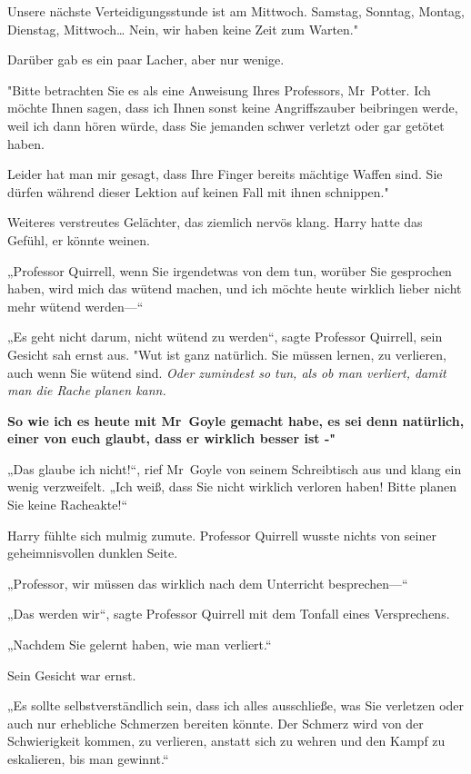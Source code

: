 {Unsere nächste Verteidigungsstunde ist am Mittwoch. Samstag, Sonntag, Montag, Dienstag, Mittwoch… Nein, wir haben keine Zeit zum Warten."

Darüber gab es ein paar Lacher, aber nur wenige.

"Bitte betrachten Sie es als eine Anweisung Ihres Professors, Mr~Potter. Ich möchte Ihnen sagen, dass ich Ihnen sonst keine Angriffszauber beibringen werde, weil ich dann hören würde, dass Sie jemanden schwer verletzt oder gar getötet haben.

Leider hat man mir gesagt, dass Ihre Finger bereits mächtige Waffen sind. Sie dürfen während dieser Lektion auf keinen Fall mit ihnen schnippen."

Weiteres verstreutes Gelächter, das ziemlich nervös klang. Harry hatte das Gefühl, er könnte weinen.

„Professor Quirrell, wenn Sie irgendetwas von dem tun, worüber Sie gesprochen haben, wird mich das wütend machen, und ich möchte heute wirklich lieber nicht mehr wütend werden—“

„Es geht nicht darum, nicht wütend zu werden“, sagte Professor Quirrell, sein Gesicht sah ernst aus. "Wut ist ganz natürlich. Sie müssen lernen, zu verlieren, auch wenn Sie wütend sind. \emph{Oder zumindest so tun, als ob man verliert, damit man die Rache planen kann.}

\textbf{So wie ich es heute mit Mr~Goyle gemacht habe, es sei denn natürlich, einer von euch glaubt, dass er wirklich besser ist -"}

„Das glaube ich nicht!“, rief Mr~Goyle von seinem Schreibtisch aus und klang ein wenig verzweifelt. „Ich weiß, dass Sie nicht wirklich verloren haben! Bitte planen Sie keine Racheakte!“

Harry fühlte sich mulmig zumute. Professor Quirrell wusste nichts von seiner geheimnisvollen dunklen Seite.

„Professor, wir müssen das wirklich nach dem Unterricht besprechen—“

„Das werden wir“, sagte Professor Quirrell mit dem Tonfall eines Versprechens.

„Nachdem Sie gelernt haben, wie man verliert.“

Sein Gesicht war ernst.

„Es sollte selbstverständlich sein, dass ich alles ausschließe, was Sie verletzen oder auch nur erhebliche Schmerzen bereiten könnte. Der Schmerz wird von der Schwierigkeit kommen, zu verlieren, anstatt sich zu wehren und den Kampf zu eskalieren, bis man gewinnt.“

}

